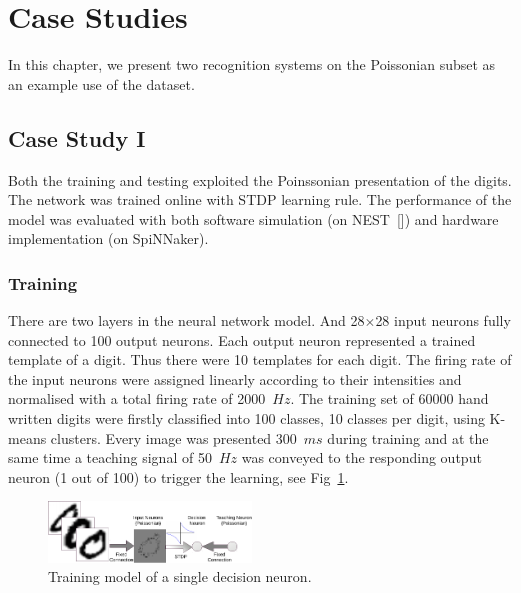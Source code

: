 \section{Case Studies}
\label{sec:test}
In this chapter, we present two recognition systems on the Poissonian subset as an example use of the dataset.
\subsection{Case Study I}
Both the training and testing exploited the Poinssonian presentation of the digits.
The network was trained online with STDP learning rule.
The performance of the model was evaluated with both software simulation (on NEST~[\cite{gewaltig2007nest}]) and hardware implementation (on SpiNNaker). 
\subsubsection{Training}
There are two layers in the neural network model.
And 28$\times$28 input neurons fully connected to 100 output neurons.
Each output neuron represented a trained template of a digit.
Thus there were 10 templates for each digit.
The firing rate of the input neurons were assigned linearly according to their intensities and normalised with a total firing rate of 2000~$Hz$.
The training set of 60000 hand written digits were firstly classified into 100 classes, 10 classes per digit, using K-means clusters.
Every image was presented 300~$ms$ during training and at the same time a teaching signal of 50~$Hz$ was conveyed to the responding output neuron (1 out of 100) to trigger the learning, see Fig~\ref{Fig:train}.
\begin{figure}[hbt!]
	\centering
	\includegraphics[width=0.48\textwidth]{images/training.pdf}
	\caption{Training model of a single decision neuron.}
	\label{Fig:train}
\end{figure} 

